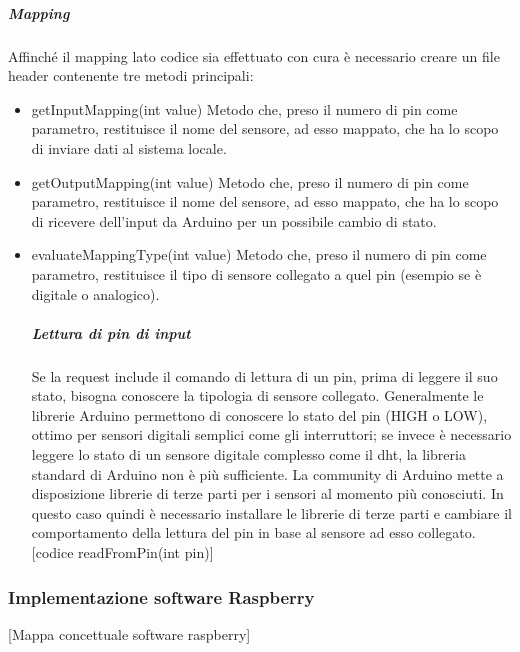 \documentclass[12pt]{article}
\begin{document}
\subparagraph{Mapping}
Affinché il mapping lato codice sia effettuato con cura è necessario creare un file header contenente tre metodi principali:
\begin{itemize}
\item getInputMapping(int value) Metodo che, preso il numero di pin come parametro, restituisce il nome del sensore, ad esso mappato, che ha lo scopo di inviare dati al sistema locale.
\item getOutputMapping(int value) Metodo che, preso il numero di pin come parametro, restituisce il nome del sensore, ad esso mappato, che ha lo scopo di ricevere dell'input da Arduino per un possibile cambio di stato.
\item evaluateMappingType(int value) Metodo che, preso il numero di pin come parametro, restituisce il tipo di sensore collegato a quel pin (esempio se è digitale o analogico).
\subparagraph{Lettura di pin di input}
Se la request include il comando di lettura di un pin, prima di leggere il suo stato, bisogna conoscere la tipologia di sensore collegato. Generalmente le librerie Arduino permettono di conoscere lo stato del pin (HIGH o LOW), ottimo per sensori digitali semplici come gli interruttori; se invece è necessario leggere lo stato di un sensore digitale complesso come il dht, la libreria standard di Arduino non è più sufficiente. La community di Arduino mette a disposizione librerie di terze parti per i sensori al momento più conosciuti. In questo caso quindi è necessario installare le librerie di terze parti e cambiare il comportamento della lettura del pin in base al sensore ad esso collegato. [codice readFromPin(int pin)]
\end{itemize}
\subsubsection{Implementazione software Raspberry}
[Mappa concettuale software raspberry]
\end{document}
